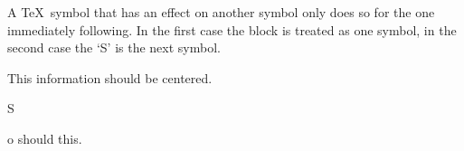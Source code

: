 A \TeX\ symbol that has an effect on another symbol only does so for the one immediately following. In the first case the block is treated as one symbol, in the second case the `S' is the next symbol.

\centerline{This information should be {centered}.}
\centerline So should this.
